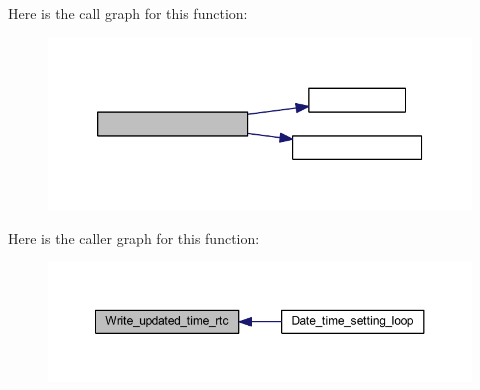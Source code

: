 Here is the call graph for this function\+:
\nopagebreak
\begin{figure}[H]
\begin{center}
\leavevmode
\includegraphics[width=339pt]{a00014_a2f6bf3793293cc3f2c09a91c3725a8af_cgraph}
\end{center}
\end{figure}
Here is the caller graph for this function\+:
\nopagebreak
\begin{figure}[H]
\begin{center}
\leavevmode
\includegraphics[width=350pt]{a00014_a2f6bf3793293cc3f2c09a91c3725a8af_icgraph}
\end{center}
\end{figure}
